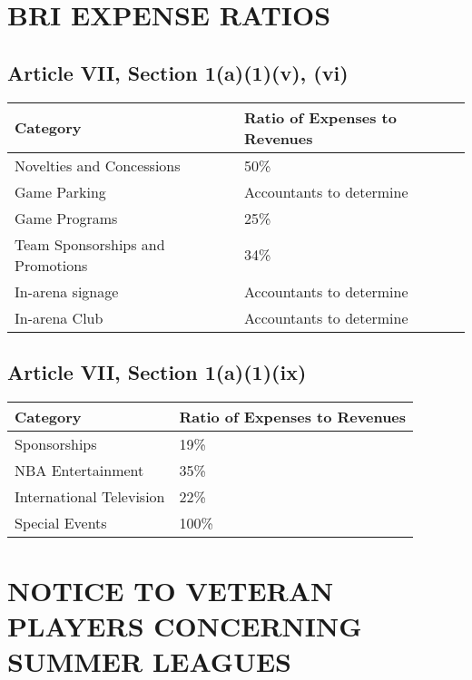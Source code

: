\documentclass[
]{book}
\begin{document}
\hypertarget{bri-expense-ratios}{%
\chapter{BRI EXPENSE RATIOS}\label{bri-expense-ratios}}

\hypertarget{article-vii-section-1a1v-vi}{%
\section{Article VII, Section 1(a)(1)(v), (vi)}\label{article-vii-section-1a1v-vi}}

\begin{longtable}[]{@{}ll@{}}
\toprule()
\textbf{Category} & \textbf{Ratio of Expenses to Revenues} \\
\midrule()
\endhead
Novelties and Concessions & 50\% \\
Game Parking & Accountants to determine \\
Game Programs & 25\% \\
Team Sponsorships and Promotions & 34\% \\
In-arena signage & Accountants to determine \\
In-arena Club & Accountants to determine \\
\bottomrule()
\end{longtable}

\hypertarget{article-vii-section-1a1ix}{%
\section{Article VII, Section 1(a)(1)(ix)}\label{article-vii-section-1a1ix}}

\begin{longtable}[]{@{}ll@{}}
\toprule()
\textbf{Category} & \textbf{Ratio of Expenses to Revenues} \\
\midrule()
\endhead
Sponsorships & 19\% \\
NBA Entertainment & 35\% \\
International Television & 22\% \\
Special Events & 100\% \\
\bottomrule()
\end{longtable}

\hypertarget{notice-to-veteran-players-concerning-summer-leagues}{%
\chapter{NOTICE TO VETERAN PLAYERS CONCERNING SUMMER LEAGUES}\label{notice-to-veteran-players-concerning-summer-leagues}}
\end{document}
